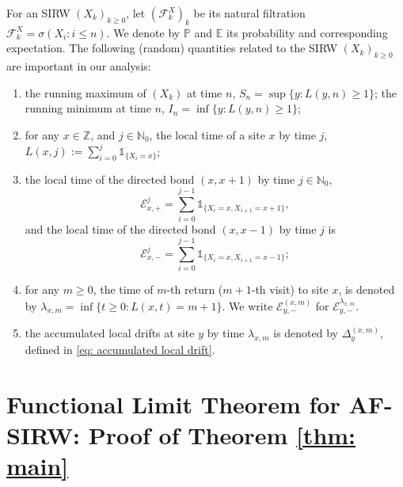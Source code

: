 \documentclass[twoside,12pt,a4paper]{article}
\numberwithin{equation}{section}
\begin{document}
	For an SIRW $(X_k)_{k\geq 0}$,  let $(\mathcal{F}^X_k)_k$ be its natural filtration $\mathcal{F}^X_k = \sigma\left(X_i: i\leq n \right).$ We denote by $\mathbb{P}$ and $\mathbb{E}$ its probability and corresponding expectation. The following (random) quantities related to the SIRW $(X_k)_{k\geq0}$ are important in our analysis:
	\begin{enumerate}
		\item the running maximum of $(X_k)$ at time $n$, $S_n= \sup\{y: L(y,n)\geq 1 \} $; the running minimum at time $n$, $I_n= \inf\{y: L(y,n)\geq 1 \} $;
		\item for any $x \in \mathbb{Z}$, and $j\in \mathbb{N}_0$, the local time of a site $x$ by time $j$, $L(x,j):= \sum_{i=0}^j \mathbb{1}_{\{X_i=x\} }$; %
		
		\item the local time of the directed bond $(x,x+1)$ by time $j\in \mathbb{N}_0$,
		$$ \mathcal{E}^j_{x,+} = \sum_{i=0}^{j-1} \mathbb{1}_{\{X_i=x, X_{i+1} =x+1 \} } ,$$
		and the local time of the directed bond $(x,x-1)$ by time $j$ is 
		$$ \mathcal{E}^j_{x,-} = \sum_{i=0}^{j-1} \mathbb{1}_{\{X_i=x, X_{i+1} =x-1 \} }; $$
		
		
		\item for any $m\geq 0$, the time of $m$-th return ($m+1$-th visit) to site $x$, is denoted by $\lambda_{x,m} = \inf\{t \geq 0: L(x,t) = m+1 \}$. We write $\mathcal{E}^{(x,m)}_{y, -}$ for $\mathcal{E}^{\lambda_{x,m}}_{y,-}$.
		
		
		\item 
		the accumulated local drifts at site $y$ by time $\lambda_{x,m}$ is denoted by $\Delta_y^{(x,m)}$, defined in \eqref{eq: accumulated local drift}.
		
	\end{enumerate}
	
	
	\section{Functional Limit Theorem for AF-SIRW: Proof of Theorem \ref{thm: main}}
	\label{sec: proof of main}
	
\end{document}
